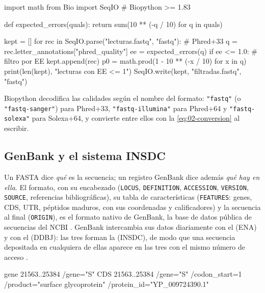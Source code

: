 \begin{codigo}[fastq\_ee.py]
import math
from Bio import SeqIO                            # Biopython >= 1.83

def expected_errors(quals):
    return sum(10 ** (-q / 10) for q in quals)

kept = []
for rec in SeqIO.parse("lecturas.fastq", "fastq"):  # Phred+33
    q = rec.letter_annotations["phred_quality"]
    ee = expected_errors(q)
    if ee <= 1.0:                                  # filtro por EE
        kept.append(rec)
    p0 = math.prod(1 - 10 ** (-x / 10) for x in q)
print(len(kept), "lecturas con EE <= 1")
SeqIO.write(kept, "filtradas.fastq", "fastq")
\end{codigo}

Biopython \parencite{c02-cock2009} decodifica las calidades según el nombre del formato: \texttt{"fastq"} (o \texttt{"fastq-sanger"}) para Phred+33, \texttt{"fastq-illumina"} para Phred+64 y \texttt{"fastq-solexa"} para Solexa+64, y convierte entre ellos con la \cref{eq:02-conversion} al escribir.

\subsection{GenBank y el sistema INSDC}

Un FASTA dice \emph{qué} es la secuencia; un registro GenBank dice además \emph{qué hay en ella}. El formato, con su encabezado (\texttt{LOCUS}, \texttt{DEFINITION}, \texttt{ACCESSION}, \texttt{VERSION}, \texttt{SOURCE}, referencias bibliográficas), su tabla de características (\texttt{FEATURES}: genes, CDS, UTR, péptidos maduros, con sus coordenadas y calificadores) y la secuencia al final (\texttt{ORIGIN}), es el formato nativo de GenBank, la base de datos pública de secuencias del NCBI \parencite{c02-sayers2025genbank}. GenBank intercambia sus datos diariamente con el  (ENA) y con el  (DDBJ): las tres forman la  (INSDC), de modo que una secuencia depositada en cualquiera de ellas aparece en las tres con el mismo número de acceso \parencite{c02-arita2021}.

\begin{consola}[fragmento de NC\_045512.2.gb]
     gene            21563..25384
                     /gene="S"
     CDS             21563..25384
                     /gene="S"
                     /codon_start=1
                     /product="surface glycoprotein"
                     /protein_id="YP_009724390.1"
\end{consola}

